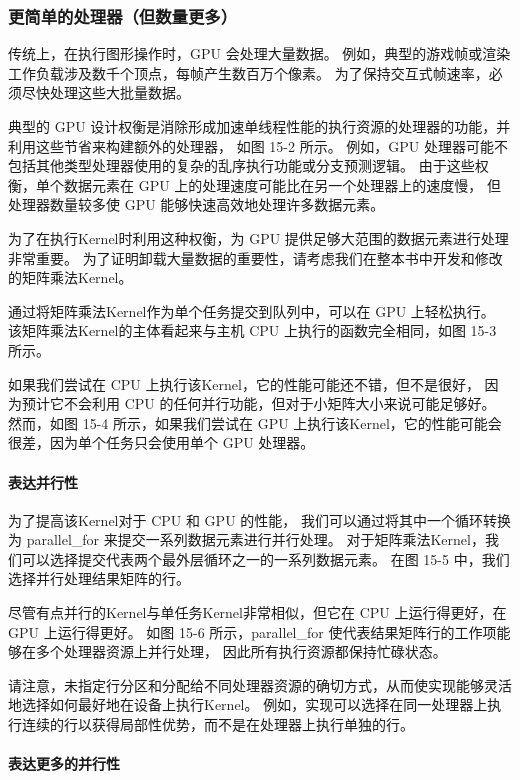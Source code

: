 \subsubsection{更简单的处理器（但数量更多）}
传统上，在执行图形操作时，GPU 会处理大量数据。 
例如，典型的游戏帧或渲染工作负载涉及数千个顶点，每帧产生数百万个像素。 
为了保持交互式帧速率，必须尽快处理这些大批量数据。

典型的 GPU 设计权衡是消除形成加速单线程性能的执行资源的处理器的功能，并利用这些节省来构建额外的处理器，
如图 15-2 所示。 例如，GPU 处理器可能不包括其他类型处理器使用的复杂的乱序执行功能或分支预测逻辑。 
由于这些权衡，单个数据元素在 GPU 上的处理速度可能比在另一个处理器上的速度慢，
但处理器数量较多使 GPU 能够快速高效地处理许多数据元素。

为了在执行Kernel时利用这种权衡，为 GPU 提供足够大范围的数据元素进行处理非常重要。 
为了证明卸载大量数据的重要性，请考虑我们在整本书中开发和修改的矩阵乘法Kernel。

通过将矩阵乘法Kernel作为单个任务提交到队列中，可以在 GPU 上轻松执行。 
该矩阵乘法Kernel的主体看起来与主机 CPU 上执行的函数完全相同，如图 15-3 所示。

如果我们尝试在 CPU 上执行该Kernel，它的性能可能还不错，但不是很好，
因为预计它不会利用 CPU 的任何并行功能，但对于小矩阵大小来说可能足够好。 
然而，如图 15-4 所示，如果我们尝试在 GPU 上执行该Kernel，它的性能可能会很差，因为单个任务只会使用单个 GPU 处理器。

\paragraph{表达并行性}

为了提高该Kernel对于 CPU 和 GPU 的性能，
我们可以通过将其中一个循环转换为 parallel\_for 来提交一系列数据元素进行并行处理。 
对于矩阵乘法Kernel，我们可以选择提交代表两个最外层循环之一的一系列数据元素。 
在图 15-5 中，我们选择并行处理结果矩阵的行。

尽管有点并行的Kernel与单任务Kernel非常相似，但它在 CPU 上运行得更好，在 GPU 上运行得更好。 
如图 15-6 所示，parallel\_for 使代表结果矩阵行的工作项能够在多个处理器资源上并行处理，
因此所有执行资源都保持忙碌状态。

请注意，未指定行分区和分配给不同处理器资源的确切方式，从而使实现能够灵活地选择如何最好地在设备上执行Kernel。 
例如，实现可以选择在同一处理器上执行连续的行以获得局部性优势，而不是在处理器上执行单独的行。

\paragraph{表达更多的并行性}

